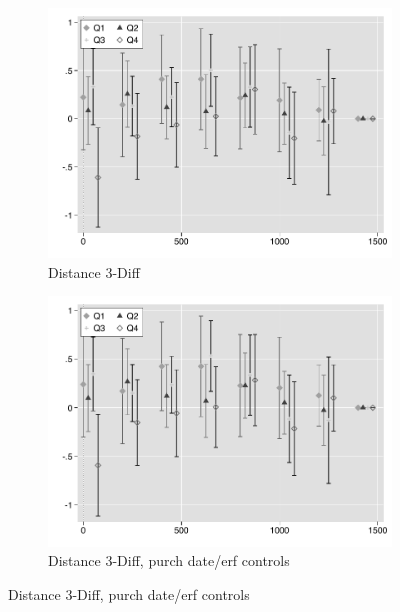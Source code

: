 \documentclass[12pt]{article}
\begin{document}
\begin{figure}
        \centering
        \begin{subfigure}[b]{0.48\textwidth}
                    \caption[Network2]%
            {{\footnotesize Distance 3-Diff}}    
            \label{fig:prefor}
            \centering
            \includegraphics[width=\textwidth,trim={0.3cm .3cm 0.1cm 0cm}, clip=true]{figures/price_dist_3d_no_ctrl_q}
        \end{subfigure}
        \hfill
        \begin{subfigure}[b]{0.48\textwidth}
                    \caption[Network2]%
            {{\footnotesize Distance 3-Diff, purch date/erf controls}}    
            \label{fig:prefor}
            \centering
            \includegraphics[width=\textwidth,trim={0.3cm .3cm 0.1cm 0cm}, clip=true]{figures/price_dist_3d_ctrl_q}

\end{subfigure}
\end{figure}
\end{document}
